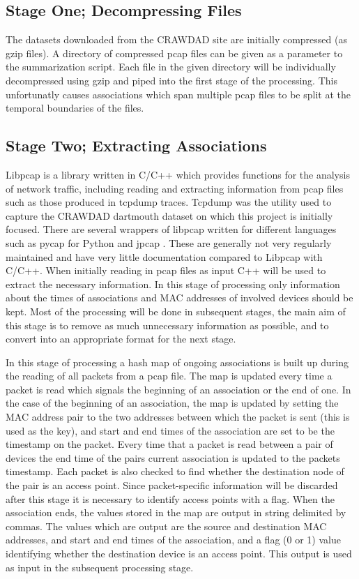 \subsection{Stage One; Decompressing Files}

The datasets downloaded from the CRAWDAD site are initially compressed (as gzip files). A directory of compressed pcap files can be given as a parameter to the summarization script. Each file in the given directory will be individually decompressed using gzip \cite{} and piped into the first stage of the processing. This unfortunatly causes associations which span multiple pcap files to be split at the temporal boundaries of the files.

\subsection{Stage Two; Extracting Associations}

Libpcap is a library written in C/C++ which provides functions for the analysis of network traffic, including reading and extracting information from pcap files such as those produced in tcpdump traces. Tcpdump was the utility used to capture the CRAWDAD dartmouth dataset on which this project is initially focused. There are several wrappers of libpcap written for different languages such as pycap \cite{pynetwork2019} for Python and jpcap \cite{charles2013}. These are generally not very regularly maintained and have very little documentation compared to Libpcap with C/C++. When initially reading in pcap files as input C++ will be used to extract the necessary information. In this stage of processing only information about the times of associations and MAC addresses of involved devices should be kept. Most of the processing will be done in subsequent stages, the main aim of this stage is to remove as much unnecessary information as possible, and to convert into an appropriate format for the next stage.

In this stage of processing a hash map of ongoing associations is built up during the reading of all packets from a pcap file. The map is updated every time a packet is read which signals the beginning of an association or the end of one. In the case of the beginning of an association, the map is updated by setting the MAC address pair to the two addresses between which the packet is sent (this is used as the key), and start and end times of the association are set to be the timestamp on the packet. Every time that a packet is read between a pair of devices the end time of the pairs current association is updated to the packets timestamp. Each packet is also checked to find whether the destination node of the pair is an access point. Since packet-specific information will be discarded after this stage it is necessary to identify access points with a flag. When the association ends, the values stored in the map are output in string delimited by commas. The values which are output are the source and destination MAC addresses, and start and end times of the association, and a flag (0 or 1) value identifying whether the destination device is an access point. This output is used as input in the subsequent processing stage.

